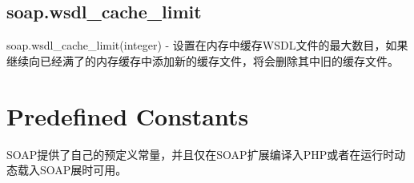 \subsection{soap.wsdl\_cache\_limit}

soap.wsdl\_cache\_limit(integer) - 设置在内存中缓存WSDL文件的最大数目，如果继续向已经满了的内存缓存中添加新的缓存文件，将会删除其中旧的缓存文件。







\section{Predefined Constants}

SOAP提供了自己的预定义常量，并且仅在SOAP扩展编译入PHP或者在运行时动态载入SOAP展时可用。


